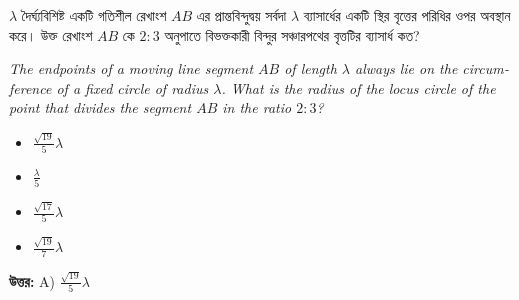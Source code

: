 \documentclass[12pt, a4paper]{article}
\begin{document}
\vspace{2em}

\begin{tcolorbox}[questionbox={প্রশ্ন (Question) 50}]
    \noindent
    $\lambda$ দৈর্ঘ্যবিশিষ্ট একটি গতিশীল রেখাংশ $AB$ এর প্রান্তবিন্দুদ্বয় সর্বদা $\lambda$ ব্যাসার্ধের একটি স্থির বৃত্তের পরিধির ওপর অবস্থান করে। উক্ত রেখাংশ $AB$ কে $2:3$ অনুপাতে বিভক্তকারী বিন্দুর সঞ্চারপথের বৃত্তটির ব্যাসার্ধ কত?
    
    \vspace{0.8em}
    \begin{english}
    \noindent\textit{\color{darkgray}
    The endpoints of a moving line segment $AB$ of length $\lambda$ always lie on the circumference of a fixed circle of radius $\lambda$. What is the radius of the locus circle of the point that divides the segment $AB$ in the ratio $2:3$?
    }
    \end{english}
\end{tcolorbox}

\vspace{1em}
\begin{itemize}[label={}, leftmargin=1cm, itemsep=0.5em]
    \item[\textbf{A)}] $\frac{\sqrt{19}}{5}\lambda$
    \item[\textbf{B)}] $\frac{\lambda}{5}$
    \item[\textbf{C)}] $\frac{\sqrt{17}}{5}\lambda$
    \item[\textbf{D)}] $\frac{\sqrt{19}}{7}\lambda$
\end{itemize}

\vspace{0.5em}
\begin{tcolorbox}[answerbox]
    \textbf{\color{success} উত্তর:} A) $\frac{\sqrt{19}}{5}\lambda$
\end{tcolorbox}
\vspace{1em}
\end{document}
